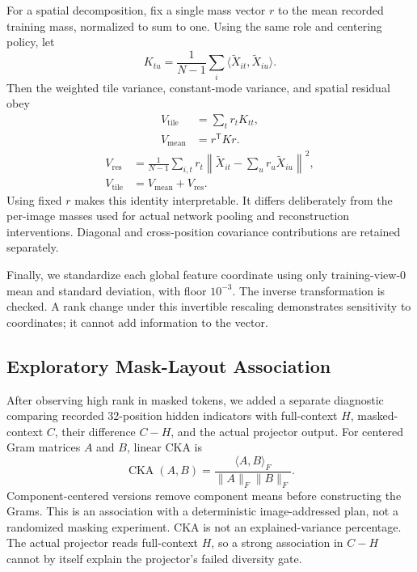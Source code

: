 For a spatial decomposition, fix a single mass vector $r$ to the mean recorded training mass, normalized to sum to one. Using the same role and centering policy, let
\begin{equation}
 K_{tu}=\frac{1}{N-1}\sum_i\langle\widetilde X_{it},\widetilde X_{iu}\rangle.
\end{equation}
Then the weighted tile variance, constant-mode variance, and spatial residual obey
\begin{equation}
\begin{aligned}
 V_{\mathrm{tile}}&=\sum_t r_tK_{tt},\\
 V_{\mathrm{mean}}&=r^{\mathsf T}Kr.
\end{aligned}
\end{equation}
\begin{align}
 V_{\mathrm{res}}&=\frac{1}{N-1}\sum_{i,t}r_t\left\|\widetilde X_{it}-\sum_u r_u\widetilde X_{iu}\right\|^2,\\[-3pt]
 V_{\mathrm{tile}}&=V_{\mathrm{mean}}+V_{\mathrm{res}}.\label{eq:partition}
\end{align}
Using fixed $r$ makes this identity interpretable. It differs deliberately from the per-image masses used for actual network pooling and reconstruction interventions. Diagonal and cross-position covariance contributions are retained separately.

Finally, we standardize each global feature coordinate using only training-view-0 mean and standard deviation, with floor $10^{-3}$. The inverse transformation is checked. A rank change under this invertible rescaling demonstrates sensitivity to coordinates; it cannot add information to the vector.

\subsection{Exploratory Mask-Layout Association}
After observing high rank in masked tokens, we added a separate diagnostic comparing recorded 32-position hidden indicators with full-context $H$, masked-context $C$, their difference $C-H$, and the actual projector output. For centered Gram matrices $A$ and $B$, linear CKA is
\begin{equation}
 \operatorname{CKA}(A,B)=\frac{\langle A,B\rangle_F}{\|A\|_F\|B\|_F}.
\end{equation}
Component-centered versions remove component means before constructing the Grams. This is an association with a deterministic image-addressed plan, not a randomized masking experiment. CKA is not an explained-variance percentage. The actual projector reads full-context $H$, so a strong association in $C-H$ cannot by itself explain the projector's failed diversity gate.
